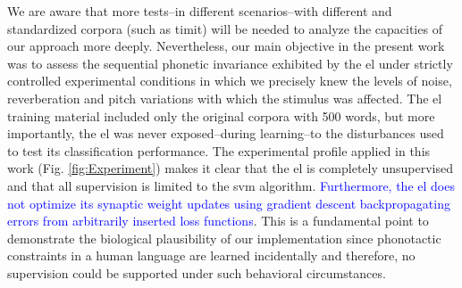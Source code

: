 \documentclass[10pt,letterpaper]{article}
\begin{document}
We are aware that more tests--in different scenarios--with different and standardized corpora (such as \gls{timit}) will be needed to analyze the capacities of our approach more deeply.
Nevertheless, our main objective in the present work was to assess the sequential phonetic invariance exhibited by the \gls{el} under strictly controlled experimental conditions in which we precisely knew the levels of noise, reverberation and pitch variations with which the stimulus was affected. The \gls{el} training material included only the original corpora with 500 words, but more importantly, the \gls{el} was never exposed--during learning--to the disturbances used to test its classification performance. The experimental profile applied in this work (Fig. \ref{fig:Experiment}) makes it clear that the \gls{el} is completely unsupervised and that all supervision is limited to the \gls{svm} algorithm. \textcolor{blue}{Furthermore, the \gls{el} does not optimize its synaptic weight updates using gradient descent backpropagating errors from arbitrarily inserted loss functions}. This is a fundamental point to demonstrate the biological plausibility of our implementation since phonotactic constraints in a human language are learned incidentally \cite{BRENT199693,saffran_1997} and therefore, no supervision could be supported under such behavioral circumstances. 

\end{document}
